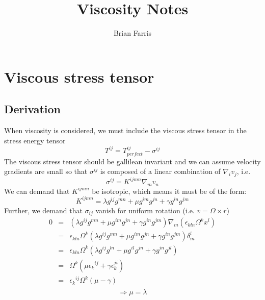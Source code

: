 \documentclass{article}
\title{Viscosity Notes}
\author{Brian Farris}
\begin{document}
\maketitle
\section{Viscous stress tensor}
\subsection{Derivation}
When viscosity is considered, we must include the viscous stress tensor in the stress energy tensor
\begin{equation*}
  T^{ij} = T^{ij}_{perfect} - \sigma^{ij}
\end{equation*}
The viscous stress tensor should be gallilean invariant and we can assume velocity gradients are small so that $\sigma^{ij}$ is composed of a linear combination of $\nabla_i v_j$, i.e. 
\begin{equation*}
  \sigma^{ij} = K^{ijmn}\nabla_{m}v_n
\end{equation*}
We can demand that $K^{ijmn}$ be isotropic, which means it must be of the form:
\begin{equation*}
  K^{ijmn} = \lambda g^{ij}g^{mn} + \mu g^{im}g^{jn}+\gamma g^{in}g^{jm}
\end{equation*}
Further, we demand that $\sigma_{ij}$ vanish for uniform rotation (i.e. $v=\Omega \times r$)
\begin{eqnarray*}
  0 &=& (\lambda g^{ij}g^{mn} + \mu g^{im}g^{jn}+\gamma g^{in}g^{jm})\nabla_{m}(\epsilon_{kln}\Omega^k x^l)\\
  &=&\epsilon_{kln}\Omega^k(\lambda g^{ij}g^{mn} + \mu g^{im}g^{jn}+\gamma g^{in}g^{jm})\delta^{l}_{m}\\
  &=&\epsilon_{kln}\Omega^k(\lambda g^{ij}g^{ln} + \mu g^{il}g^{jn}+\gamma g^{in}g^{jl})\\
&=&\Omega^k(\mu \epsilon_{k}{}^{ij}+\gamma \epsilon_{k}^{ji})\\
&=&\epsilon_{k}{}^{ij}\Omega^k(\mu -\gamma)\\
\end{eqnarray*}
\begin{equation*}
  \Rightarrow \mu=\lambda
\end{equation*}
\end{document}
